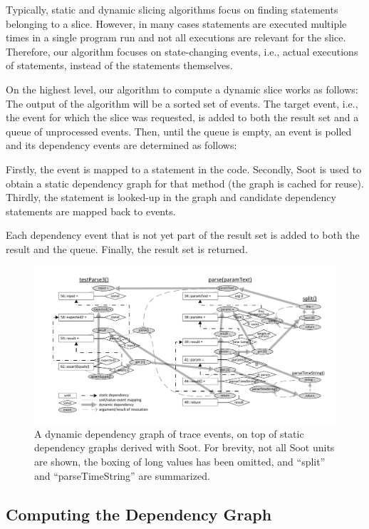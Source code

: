 Typically, static and dynamic slicing algorithms focus on finding statements belonging to a slice.
However, in many cases statements are executed multiple times in a single program run and not all executions are relevant for the slice.
Therefore, our algorithm focuses on state-changing events, i.e., actual executions of statements, instead of the statements themselves.

On the highest level, our algorithm to compute a dynamic slice works as follows:
The output of the algorithm will be a sorted set of events.
The target event, i.e., the event for which the slice was requested, is added to both the result set and a queue of unprocessed events.
Then, until the queue is empty, an event is polled and its dependency events are determined as follows:

Firstly, the event is mapped to a statement in the code.
Secondly, Soot is used to obtain a static dependency graph for that method (the graph is cached for reuse).
Thirdly, the statement is looked-up in the graph and candidate dependency statements are mapped back to events.

Each dependency event that is not yet part of the result set is added to both the result and the queue.
Finally, the result set is returned.

\begin{figure}[t]
\centering
\includegraphics[width=.90\linewidth, clip, trim=12mm 7mm 8mm 7mm]{img/graph}
\caption{A dynamic dependency graph of trace events, on top of static dependency graphs derived with Soot. For brevity, not all Soot units are shown, the boxing of long values has been omitted, and ``split'' and ``parseTimeString'' are summarized.}
\label{fig:graph}
\end{figure}

\subsection{Computing the Dependency Graph}

